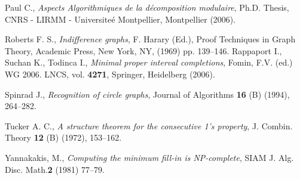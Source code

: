 \documentclass[12pt]{book}
\theoremstyle{plain}
\theoremstyle{remark}
\begin{document}
\begin{thebibliography}{Weibel}
 Paul C., \emph{Aspects Algorithmiques de la d\'ecomposition modulaire}, Ph.D. Thesis, CNRS - LIRMM - Universite\'e Montpellier, Montpellier (2006).

 Roberts F. S., \emph{Indifference graphs}, F. Harary (Ed.), Proof Techniques in Graph Theory, Academic Press, New York, NY, (1969) pp. 139--146.
 Rappaport I., Suchan K., Todinca I., \emph{Minimal proper interval completions}, Fomin, F.V. (ed.) WG 2006. LNCS, vol. \textbf{4271}, Springer, Heidelberg (2006).

 Spinrad J., \emph{Recognition of circle graphs}, Journal of Algorithms \textbf{16} (B) (1994), 264--282.

 Tucker A. C., \emph{A structure theorem for the consecutive 1's property}, J. Combin. Theory \textbf{12} (B) (1972), 153--162.

 Yannakakis, M., \emph{Computing the minimum fill-in is NP-complete}, SIAM J. Alg. Disc. Math.\textbf{2} (1981) 77--79.


\end{thebibliography}
\end{document}
